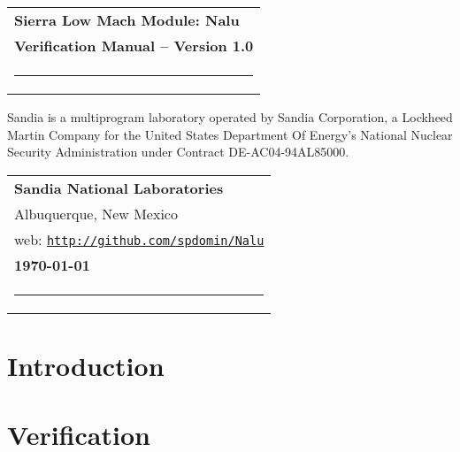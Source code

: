 \documentclass[12pt]{report}
\begin{document}

\thispagestyle{empty}

\phantom{.}
\vspace{1.0in}

\noindent
\begin{tabular}{l}
{\Large \bf Sierra Low Mach Module: Nalu} \\
{\Large \bf Verification Manual -- Version 1.0} \\[12pt]
\rule[5pt]{6.5in}{0.05in} \\
\end{tabular}

\vspace{1.5in}

Sandia is a multiprogram laboratory operated by Sandia Corporation, a Lockheed Martin
Company for the United States Department Of Energy's National Nuclear
Security Administration under Contract DE-AC04-94AL85000.

\vspace{3.0in}

\noindent
\begin{tabular}{l}
{\large \bf Sandia National Laboratories} \\
{Albuquerque, New Mexico} \\
{web: \texttt{\href{http://github.com/spdomin/Nalu}{http://github.com/spdomin/Nalu}}} \\
{\bf \today} \\
\rule[7pt]{6.5in}{0.025in}
\end{tabular}

\clearpage
{}
\setcounter{page}{2}

\clearpage
\tableofcontents

\clearpage
\ifpdf
  \label{listoffigures}
\fi
{}
\listoffigures


\clearpage
{}
\setcounter{page}{1}

\section{Introduction}


\section{Verification}




\end{document}
